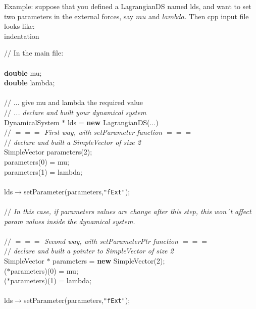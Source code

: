 \documentclass[10pt]{article}
\begin{document}
Example: suppose that you defined a LagrangianDS named lds, and want to set two parameters in the external forces, say $mu$ and $lambda$. Then cpp input file looks like: \\
\expandafter\ifx\csname indentation\endcsname\relax%
\newlength{\indentation}\fi
\setlength{\indentation}{0.5em}
\begin{flushleft}
{$//$\textit{} In the main file:{}\mbox{}\\
}\mbox{}\\
{\bf double} mu;\mbox{}\\
{\bf double} lambda; \mbox{}\\
\mbox{}\\
{$//$\textit{} ... give mu and lambda the required value{}\mbox{}\\
}{$//$\it{} ... declare and built your dynamical system{}\mbox{}\\
}DynamicalSystem $\ast$ lds = {\bf new} LagrangianDS($\ldots$) \mbox{}\\
{$//$\it{} $=$$=$$=$ First way, with setParameter function $=$$=$$=$ {}\mbox{}\\
}{$//$\it{} declare and built a SimpleVector of size 2{}\mbox{}\\
}SimpleVector parameters(2);\mbox{}\\
parameters(0) = mu;\mbox{}\\
parameters(1) = lambda;\mbox{}\\
\mbox{}\\
lds$\rightarrow$setParameter(parameters,{\tt"fExt"});\mbox{}\\
\mbox{}\\
{$//$\it{} In this case, if parameters values are change after this step, this won´t affect param values inside the dynamical system. {}\mbox{}\\
}\mbox{}\\
{$//$\it{} $=$$=$$=$ Second way, with setParameterPtr function $=$$=$$=$ {}\mbox{}\\
}{$//$\it{} declare and built a pointer to SimpleVector of size 2{}\mbox{}\\
}SimpleVector $\ast$ parameters = {\bf new} SimpleVector(2);\mbox{}\\
($\ast$parameters)(0) = mu;\mbox{}\\
($\ast$parameters)(1) = lambda;\mbox{}\\
\mbox{}\\
lds$\rightarrow$setParameter(parameters,{\tt"fExt"});\mbox{}\\
\mbox{}\\

\end{flushleft}
\end{document}
